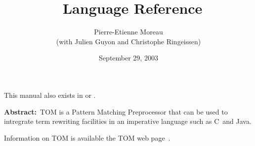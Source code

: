 \documentclass[a4paper]{book}
\title{\TOM\ Language Reference}
\author{Pierre-Etienne Moreau\\(with Julien Guyon and Christophe Ringeissen)}
\date{September 29, 2003}
\newcommand{\Clang}{\textsf{C}}
\newcommand{\Java}{\textsf{Java}}
\begin{document}
\maketitle

\begin{table}[h]
This manual also exists in   or .
\end{table}

\textbf{Abstract:}~TOM is a Pattern Matching Preprocessor that can be used to
intregrate term rewriting facilities in an imperative language such as
\Clang\ and \Java.

Information on TOM is available the TOM web page~.

\tableofcontents

%










\end{document}

